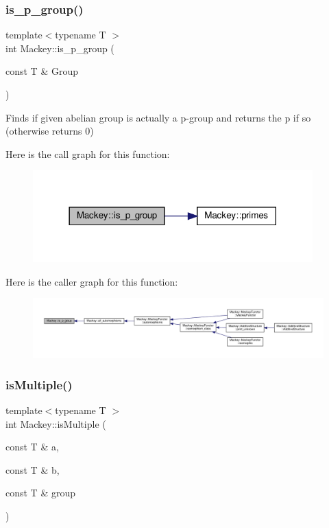 \subsubsection{\texorpdfstring{is\+\_\+p\+\_\+group()}{is\_p\_group()}}
{\footnotesize\ttfamily template$<$typename T $>$ \\
int Mackey\+::is\+\_\+p\+\_\+group (\begin{DoxyParamCaption}\item[{const T \&}]{Group }\end{DoxyParamCaption})}



Finds if given abelian group is actually a p-\/group and returns the p if so (otherwise returns 0) 

Here is the call graph for this function\+:\nopagebreak
\begin{figure}[H]
\begin{center}
\leavevmode
\includegraphics[width=306pt]{namespaceMackey_a2b6ac22efe0be546f2c3f8abc2ceb5b7_cgraph}
\end{center}
\end{figure}
Here is the caller graph for this function\+:\nopagebreak
\begin{figure}[H]
\begin{center}
\leavevmode
\includegraphics[width=350pt]{namespaceMackey_a2b6ac22efe0be546f2c3f8abc2ceb5b7_icgraph}
\end{center}
\end{figure}
\mbox{\label{namespaceMackey_af70b0c547f7121b8815885dfebde67d9}} 
\subsubsection{\texorpdfstring{is\+Multiple()}{isMultiple()}}
{\footnotesize\ttfamily template$<$typename T $>$ \\
int Mackey\+::is\+Multiple (\begin{DoxyParamCaption}\item[{const T \&}]{a,  }\item[{const T \&}]{b,  }\item[{const T \&}]{group }\end{DoxyParamCaption})}



